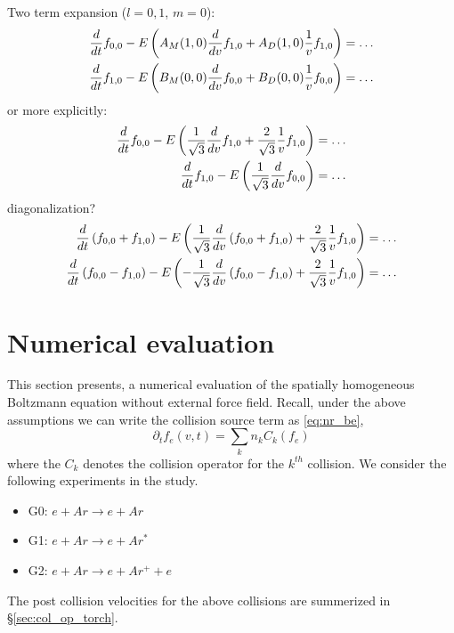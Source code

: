 \documentclass{article}[draft]
\begin{document}
Two term expansion ($l = 0,1$, $m=0$):
\begin{align*}
\frac{d}{dt} f_{0,0} - E 
\left( A_M\of{1,0} \frac{d}{d\vr} f_{1,0} 
+ A_D\of{1,0} \frac{1}{\vr} f_{1,0} \right) &= \ldots
\\
\frac{d}{dt} f_{1,0} - E 
\left( B_M\of{0,0} \frac{d}{d\vr} f_{0,0} 
+ B_D\of{0,0} \frac{1}{\vr} f_{0,0} \right) &= \ldots
\end{align*}
or more explicitly:
\begin{align*}
\frac{d}{dt} f_{0,0} - E 
\left( \frac{1}{\sqrt{3}} \frac{d}{dv} f_{1,0} 
+  \frac{2}{\sqrt{3}} \frac{1}{v} f_{1,0} \right) &= \ldots
\\
\frac{d}{dt} f_{1,0} - E 
\left( \frac{1}{\sqrt{3}} \frac{d}{dv} f_{0,0} \right) &= \ldots
\end{align*}
diagonalization?
\begin{align*}
\frac{d}{dt} \left( f_{0,0} + f_{1,0} \right) - E 
\left( \frac{1}{\sqrt{3}} \frac{d}{dv} \left( f_{0,0} + f_{1,0} \right) 
+  \frac{2}{\sqrt{3}} \frac{1}{v} f_{1,0} \right) &= \ldots
\\
\frac{d}{dt} \left( f_{0,0} - f_{1,0} \right) - E 
\left( - \frac{1}{\sqrt{3}} \frac{d}{dv} \left( f_{0,0} - f_{1,0} \right) 
+  \frac{2}{\sqrt{3}} \frac{1}{v} f_{1,0} \right) &= \ldots
\end{align*}



\newpage
\section{Numerical evaluation}
This section presents, a numerical evaluation of the spatially homogeneous Boltzmann equation without external force field. Recall, under the above assumptions we can write the collision source term as \eqref{eq:nr_be}, 
\begin{equation}
	\partial_t f_e(v,t) = \sum_{k} n_k C_k(f_e) \label{eq:nr_be}
\end{equation} where the $C_k$ denotes the collision operator for the $k^{th}$ collision. We consider the following experiments in the study. 
\begin{itemize}
\item G0: $e + Ar \rightarrow e + Ar $ 
\item G1: $e + Ar \rightarrow e + Ar^*$
\item G2: $e + Ar \rightarrow e + Ar^+ + e$ 
\end{itemize} The post collision velocities for the above collisions are summerized in \S\ref{sec:col_op_torch}.
\end{document}
